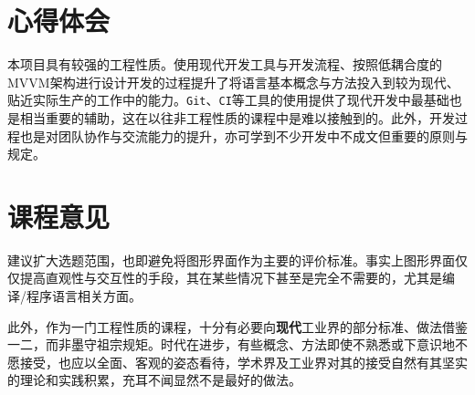 \documentclass[a4paper,11pt,fontset=fandol]{article}
\begin{document}
\section{心得体会}
本项目具有较强的工程性质。使用现代开发工具与开发流程、按照低耦合度的MVVM架构进行设计开发的过程提升了将语言基本概念与方法投入到较为现代、贴近实际生产的工作中的能力。\texttt{Git}、\texttt{CI}等工具的使用提供了现代开发中最基础也是相当重要的辅助，这在以往非工程性质的课程中是难以接触到的。此外，开发过程也是对团队协作与交流能力的提升，亦可学到不少开发中不成文但重要的原则与规定。

\section{课程意见}
建议扩大选题范围，也即避免将图形界面作为主要的评价标准。事实上图形界面仅仅提高直观性与交互性的手段，其在某些情况下甚至是完全不需要的，尤其是编译/程序语言相关方面。

此外，作为一门工程性质的课程，十分有必要向\textbf{现代}工业界的部分标准、做法借鉴一二，而非墨守祖宗规矩。时代在进步，有些概念、方法即使不熟悉或下意识地不愿接受，也应以全面、客观的姿态看待，学术界及工业界对其的接受自然有其坚实的理论和实践积累，充耳不闻显然不是最好的做法。
\end{document}
